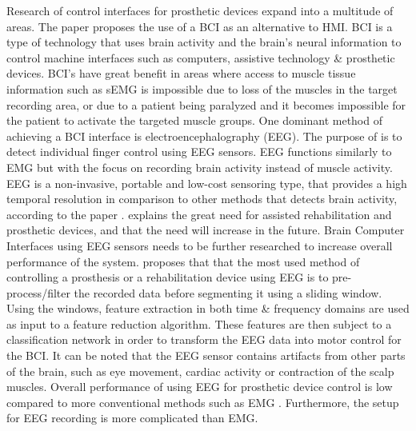 \documentclass[../main.tex]{subfiles}
\begin{document}
Research of control interfaces for prosthetic devices expand into a multitude of areas.
The paper \cite{fnins2016} proposes the use of a \gls{BCI} as an alternative to \gls{HMI}.
BCI is a type of technology that uses brain activity and the brain's neural information to control machine interfaces such as computers, assistive technology \& prosthetic devices.
BCI's have great benefit in areas where access to muscle tissue information such as sEMG is impossible due to loss of the muscles in the target recording area, or due to a patient being paralyzed and it becomes impossible for the patient to activate the targeted muscle groups.
One dominant method of achieving a BCI interface is electroencephalography (EEG).
The purpose of \cite{fnins2016} is to detect individual finger control using EEG sensors. 
EEG functions similarly to EMG but with the focus on recording brain activity instead of muscle activity.
EEG is a non-invasive, portable and low-cost sensoring type, that provides a high temporal resolution in comparison to other methods that detects brain activity, according to the paper \cite{quraishi2018}.
\cite{quraishi2018} explains the great need for assisted rehabilitation and prosthetic devices, and that the need will increase in the future.
Brain Computer Interfaces using EEG sensors needs to be further researched to increase overall performance of the system.
\cite{quraishi2018} proposes that that the most used method of controlling a prosthesis or a rehabilitation device using EEG is to pre-process/filter the recorded data before segmenting it using a sliding window.
Using the windows, feature extraction in both time \& frequency domains are used as input to a feature reduction algorithm.
These features are then subject to a classification network in order to transform the EEG data into motor control for the BCI.
It can be noted that the EEG sensor contains artifacts from other parts of the brain, such as eye movement, cardiac activity or contraction of the scalp muscles. 
Overall performance of using EEG for prosthetic device control is low compared to more conventional methods such as EMG \cite{quraishi2018} .
Furthermore, the setup for EEG recording is more complicated than EMG.
\end{document}
